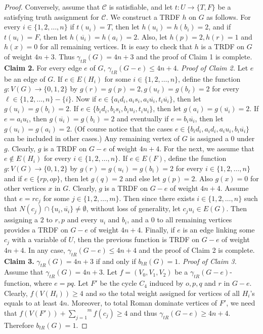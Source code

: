 \documentclass[10pt,a4paper]{amsart}
\begin{document}
\begin{proof}
Conversely, assume that $\mathcal{C}$ is satisfiable, and let $t:U\longrightarrow \{T,F\}$ be a satisfying truth assignment for $\mathcal{C}$. We construct a TRDF $h$ on $G$ as follows. For every $i \in \{1, 2, \dots , n\}$ if $t(u_i)=T$, then let $h(u_i)=h(b_i)=2$, and if $t(u_i)=F$, then let $h(\overline{u_i})=h(a_i)=2$. Also, let $h(p)=2, h(r)=1$ and $h(x)=0$
for all remaining vertices. It is easy to check that $h$ is a TRDF on $G$ of weight $4n+3$. Thus $\gamma _{tR}(G)=4n+3$ and the proof of Claim 1 is complete.\newline
\newline
\textbf{Claim 2.} For every edge $e$ of $G$, $\gamma _{tR}(G-e)\leq 4n+4$.
\newline
\textit{Proof of Claim 2.} Let $e$ be an edge of $G$. If $e\in E(H_{i})$ for some $i\in \{1,2,\dots ,n\}$, define the function $g:V(G)\longrightarrow \{0,1,2\}$ by $g(r)=g(p)=2, g(u_\ell)=g(b_\ell)=2$ for every $\ell \in \{1,2,\dots ,n\}-\{i\}$.
Now if $e\in \{a_id_i, a_is_i, a_i\overline{u_i}, t_i\overline{u_i}\}$, then let $g(u_i)=g(b_i)=2$. If $e\in \{b_id_i, b_is_i, b_iu_i, t_iu_i\}$, then let $g(a_i)=g(\overline{u_i})=2$. If $e=a_iu_i$, then $g(\overline{u_i})=g(b_i)=2$ and eventually if $e=b_i\overline{u_i}$, then let $g(u_i)=g(a_i)=2$. (Of course notice that the cases $e\in \{b_id_i, a_id_i, a_iu_i, b_i\overline{u_i}\}$ can be included in other cases.)
Any remaining vertex of $G$ is assigned a $0$ under $g$. Clearly, $g$ is a TRDF on $G-e$ of weight $4n+4$. For the next, we assume that $e\notin E(H_{i})$ for every $i\in
\{1,2,\dots ,n\}$. If $e\in E(F)$, define the function $g:V(G)\longrightarrow \{0,1,2\}$ by $g(r)=g(u_{i})=g(b_{i})=2$ for every
$i\in \{1,2,\dots ,n\}$ and if $e\in \{rp, op\}$, then let $g(q)=2$ and else let $g(p)=2$. Also $g(x)=0$ for other vertices $x$ in $G$. Clearly, $g$ is a TRDF on $G-e$ of weight $4n+4$. Assume that
$e=rc_j$ for some $j\in \{1,2,\dots ,m\}$. Then since there exists $i\in \{1,2,\dots ,n\}$
such that $N(c_j)\cap \{u_i,\overline{u_i}\}\neq \emptyset$, without
loss of generality, let $c_ju_i\in E(G)$. Then assigning a $2$ to $r,p$
and every $u_i$ and $b_i$, and a $0$ to all remaining vertices provides
a TRDF on $G-e$ of weight $4n+4$. Finally, if $e$ is an edge linking
some $c_j$ with a variable of $U$, then the previous function is
TRDF on $G-e$ of weight $4n+4$. In any case, $\gamma _{tR}(G-e)\leq
4n+4$ and the proof of Claim 2 is complete.\newline
\newline
\textbf{Claim 3.} $\gamma _{tR}(G)=4n+3$ if and only if $b_{tR}(G)=1.$
\newline
\textit{Proof of Claim 3.} Assume that $\gamma _{tR}(G)=4n+3$. Let $f=(V_0, V_1, V_2)$ be a $\gamma _{tR}(G-e)$-function, where $e=pq$. Let $F'$ be the cycle $C_4$ induced by $o,p,q$ and $r$ in $G-e$.
Clearly, $f(V(H_i))\geq 4$ and so the total weight assigned for vertices
of all $H_i$'s equals to at least $4n$. Moreover, to total Roman dominate
vertices of $F'$, we need that $f(V(F'))+\overset{m}{\underset{j=1}{\sum }}f(c_j)\geq 4$ and thus $\gamma _{tR}(G-e)\geq 4n+4$. Therefore $b_{tR}(G)=1$.


\end{proof}
\end{document}
